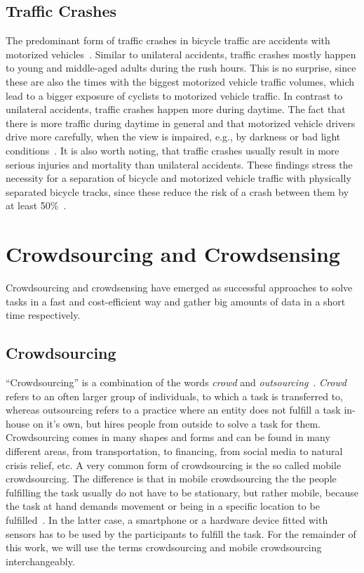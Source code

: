 \subsection*{Traffic Crashes}
The predominant form of traffic crashes in bicycle traffic are accidents with motorized vehicles~\cite{juhra2012bicycle,naess2020number}.
Similar to unilateral accidents, traffic crashes mostly happen to young and middle-aged adults during the rush hours.
This is no surprise, since these are also the times with the biggest motorized vehicle traffic volumes, which lead to a bigger exposure of cyclists to motorized vehicle traffic.
In contrast to unilateral accidents, traffic crashes happen more during daytime.
The fact that there is more traffic during daytime in general and that motorized vehicle drivers drive more carefully, when the view is impaired, e.g., by darkness or bad light conditions~\cite{schepers2011road}.
It is also worth noting, that traffic crashes usually result in more serious injuries and mortality than unilateral accidents. 
These findings stress the necessity for a separation of bicycle and motorized vehicle traffic with physically separated bicycle tracks, since these reduce the risk of a crash between them by at least 50\%~\cite{van2021safety}.


\section{Crowdsourcing and Crowdsensing}
\label{sec:crowdsourcing_crowdsensing_background}
Crowdsourcing and crowdsensing have emerged as successful approaches to solve tasks in a fast and cost-efficient way and gather big amounts of data in a short time respectively.

\subsection*{Crowdsourcing}
``Crowdsourcing'' is a combination of the words \textit{crowd} and \textit{outsourcing}~\cite{howe2006rise}.
\textit{Crowd} refers to an often larger group of individuals, to which a task is transferred to, whereas outsourcing refers to a practice where an entity does not fulfill a task in-house on it's own, but hires people from outside to solve a task for them.
Crowdsourcing comes in many shapes and forms and can be found in many different areas, from transportation, to financing, from social media to natural crisis relief, etc.
A very common form of crowdsourcing is the so called mobile crowdsourcing.
The difference is that in mobile crowdsourcing the the people fulfilling the task usually do not have to be stationary, but rather mobile, because the task at hand demands movement or being in a specific location to be fulfilled~\cite{phuttharak2018review}.
In the latter case, a smartphone or a hardware device fitted with sensors has to be used by the participants to fulfill the task.
For the remainder of this work, we will use the terms crowdsourcing and mobile crowdsourcing interchangeably.

